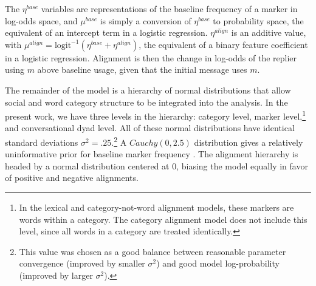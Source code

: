 \documentclass[11pt]{article}
\begin{document}
The $\eta^{base}$ variables are representations of the baseline frequency of a marker in log-odds space, and $\mu^{base}$ is simply a conversion of $\eta^{base}$ to probability space, the equivalent of an intercept term in a logistic regression. $\eta^{align}$ is an additive value, with $\mu^{align} = \textrm{logit}^{-1}(\eta^{base}+\eta^{align})$, the equivalent of a binary feature coefficient in a logistic regression.  Alignment is then the change in log-odds of the replier using $m$ above baseline usage, given that the initial message uses $m$.

The remainder of the model is a hierarchy of normal distributions that allow social and word category structure to be integrated into the analysis. In the present work, we have three levels in the hierarchy: category level, marker level,\footnote{In the lexical and category-not-word alignment models, these markers are words within a category. The category alignment model does not include this level, since all words in a category are treated identically.} and conversational dyad level. All of these normal distributions have identical standard deviations $\sigma^2=.25$.\footnote{This value was chosen as a good balance between reasonable parameter convergence (improved by smaller $\sigma^2$) and good model log-probability (improved by larger $\sigma^2$).}  A $Cauchy(0,2.5)$ distribution gives a relatively uninformative prior for baseline marker frequency \cite{GelmanEtAl2008}. The alignment hierarchy is headed by a normal distribution centered at 0, biasing the model equally in favor of positive and negative alignments.


\end{document}
